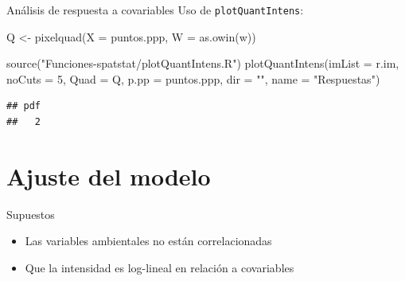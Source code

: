 \documentclass[
  11pt,
  ignorenonframetext,
]{beamer}
\newenvironment{Shaded}{}{}
\newcommand{\AttributeTok}[1]{\textcolor[rgb]{0.49,0.56,0.16}{#1}}
\newcommand{\DecValTok}[1]{\textcolor[rgb]{0.25,0.63,0.44}{#1}}
\newcommand{\FunctionTok}[1]{\textcolor[rgb]{0.02,0.16,0.49}{#1}}
\newcommand{\NormalTok}[1]{#1}
\newcommand{\OtherTok}[1]{\textcolor[rgb]{0.00,0.44,0.13}{#1}}
\newcommand{\StringTok}[1]{\textcolor[rgb]{0.25,0.44,0.63}{#1}}
\providecommand{\tightlist}{%
  \setlength{\itemsep}{0pt}\setlength{\parskip}{0pt}}
\begin{document}
\begin{frame}[fragile]{Análisis de respuesta a covariables}
\protect\hypertarget{anuxe1lisis-de-respuesta-a-covariables-1}{}
Uso de \texttt{plotQuantIntens}:

\begin{Shaded}
\begin{Highlighting}[]
\NormalTok{Q }\OtherTok{\textless{}{-}} \FunctionTok{pixelquad}\NormalTok{(}\AttributeTok{X =}\NormalTok{ puntos.ppp, }\AttributeTok{W =} \FunctionTok{as.owin}\NormalTok{(w))}

\FunctionTok{source}\NormalTok{(}\StringTok{"Funciones{-}spatstat/plotQuantIntens.R"}\NormalTok{)}
\FunctionTok{plotQuantIntens}\NormalTok{(}\AttributeTok{imList =}\NormalTok{ r.im,}
                \AttributeTok{noCuts =} \DecValTok{5}\NormalTok{,}
                \AttributeTok{Quad =}\NormalTok{ Q,}
                \AttributeTok{p.pp =}\NormalTok{ puntos.ppp,}
                \AttributeTok{dir =} \StringTok{""}\NormalTok{,}
                \AttributeTok{name =} \StringTok{"Respuestas"}\NormalTok{)}
\end{Highlighting}
\end{Shaded}

\begin{verbatim}
## pdf 
##   2
\end{verbatim}
\end{frame}

\hypertarget{ajuste-del-modelo}{%
\section{Ajuste del modelo}\label{ajuste-del-modelo}}

\begin{frame}{Supuestos}
\protect\hypertarget{supuestos}{}
\begin{itemize}
\tightlist
\item
  Las variables ambientales no están correlacionadas
\item
  Que la intensidad es log-lineal en relación a covariables
\end{itemize}
\end{frame}
\end{document}
